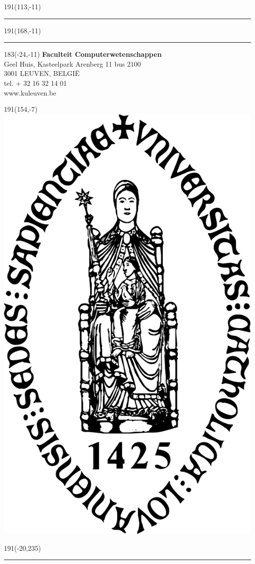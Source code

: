 \documentclass[12pt,a4paper,oneside]{book}
\theoremstyle{definition}
\begin{document}
\newpage
\thispagestyle{empty}
\sffamily
%
\begin{textblock}{191}(113,-11)
{\color{blueline}\rule{160pt}{5.5pt}}
\end{textblock}
%
\begin{textblock}{191}(168,-11)
{\color{blueline}\rule{5.5pt}{59pt}}
\end{textblock}
%
\begin{textblock}{183}(-24,-11)
\textblockcolour{}
\flushright
\fontsize{7}{7.5}\selectfont
\textbf{Faculteit Computerwetenschappen}\\
Geel Huis, Kasteelpark Arenberg 11 bus 2100\\
3001 LEUVEN, BELGI\"{E}\\
tel. + 32 16 32 14 01\\
www.kuleuven.be\\
\end{textblock}
%
\begin{textblock}{191}(154,-7)
\textblockcolour{}
\includegraphics*[height=16.5truemm]{sedes}
\end{textblock}
%
\begin{textblock}{191}(-20,235)
{\color{bluetitle}\rule{544pt}{55pt}}
\end{textblock}
\end{document}
